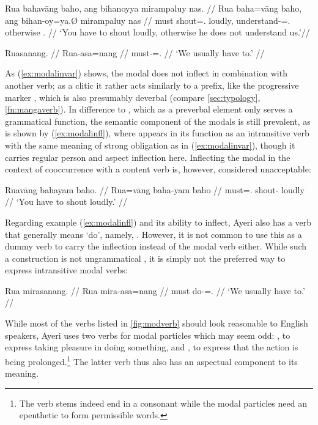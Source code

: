 \pex
\a\label{ex:modalinvar}\begingl
	\gla Rua bahavāng baho, ang bihanoyya mirampaluy nas. //
	\glb Rua baha=vāng baho, ang bihan-oy=ya.Ø mirampaluy nas //
	\glc must shout=\Ssg{}.\Aarg{} loudly, \AgtT{} 
		understand-\Neg{}=\TsgM{}.\Top{} otherwise \Fpl{}.\Parg{} //
	\glft `You have to shout loudly, otherwise he does not understand 
		us.'//
\endgl

\a\label{ex:modalinfl}\begingl
	\gla Ruasanang. //
	\glb Rua-asa=nang //
	\glc must-\Hab{}=\Fpl{}.\Aarg{} //
	\glft `We usually have to.' //
\endgl

\xe

As (\ref{ex:modalinvar}) shows, the modal does not inflect in combination with
another verb; as a clitic it rather acts similarly to a prefix, like the
progressive marker , which is also presumably deverbal
(compare \autoref{sec:typology}, \autoref{fn:mangaverb}). In difference to
, which as a preverbal element only serves a grammatical
function, the semantic component of the modals is still prevalent, as is shown
by (\ref{ex:modalinfl}), where  appears in its function as
an intransitive verb with the same meaning of strong obligation as in
(\ref{ex:modalinvar}), though it carries regular person and aspect inflection
here. Inflecting the modal in the context of cooccurrence with a content verb
is, however, considered unacceptable:

\ex\ljudge*\begingl
	\gla Ruavāng bahayam baho. //
	\glb Rua=vāng baha-yam baho //
	\glc must=\Ssg{}.\AgtT{} shout-\Ptcp{} loudly //
	\glft `You have to shout loudly.' //
\endgl\xe

Regarding example (\ref{ex:modalinfl}) and its ability to inflect, Ayeri also
has a verb that generally means `do', namely, . However, it
is not common to use this as a dummy verb to carry the inflection instead of
the modal verb either. While such a construction is not ungrammatical , it is simply not the preferred way to express intransitive modal verbs:

\ex\ljudge\ques\begingl
	\gla Rua mirasanang. //
	\glb Rua mira-asa=nang //
	\glc must do-\Hab{}=\Fpl{}.\Aarg{} //
	\glft `We usually have to.' //
\endgl\xe

While most of the verbs listed in \autoref{fig:modverb} should look 
reasonable to English speakers, Ayeri uses two verbs for modal particles which 
may seem odd: , to express taking pleasure in doing 
something, and , to express that the action is 
being prolonged.\footnote{The verb stems indeed end in a consonant while the 
modal particles need an epenthetic  to form permissible words.} The 
latter verb thus also has an aspectual component to its meaning.

